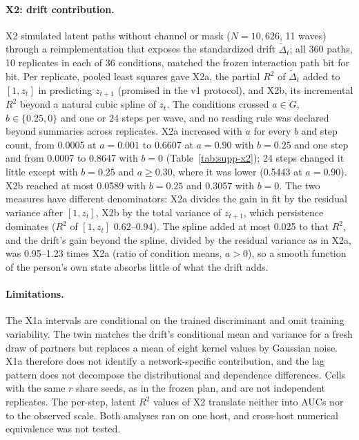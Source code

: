\paragraph{X2: drift contribution.}
X2 simulated latent paths without channel or mask ($N=10{,}626$, 11 waves) through a reimplementation that exposes the standardized drift $\tilde\Delta_t$; all 360 paths, 10 replicates in each of 36 conditions, matched the frozen interaction path bit for bit. %
Per replicate, pooled least squares gave X2a, the partial $R^2$ of $\tilde\Delta_t$ added to $[1,z_t]$ in predicting $z_{t+1}$ (promised in the v1 protocol), and X2b, its incremental $R^2$ beyond a natural cubic spline of $z_t$. %
The conditions crossed $a\in G$, $b\in\{0.25,0\}$ and one or 24 steps per wave, and no reading rule was declared beyond summaries across replicates. %
X2a increased with $a$ for every $b$ and step count, from 0.0005 at $a=0.001$ to 0.6607 at $a=0.90$ with $b=0.25$ and one step and from 0.0007 to 0.8647 with $b=0$ (Table~\ref{tab:supp-x2}); 24 steps changed it little except with $b=0.25$ and $a\geq0.30$, where it was lower (0.5443 at $a=0.90$). %
X2b reached at most 0.0589 with $b=0.25$ and 0.3057 with $b=0$. %
The two measures have different denominators: X2a divides the gain in fit by the residual variance after $[1,z_t]$, X2b by the total variance of $z_{t+1}$, which persistence dominates ($R^2$ of $[1,z_t]$ 0.62--0.94). %
The spline added at most 0.025 to that $R^2$, and the drift's gain beyond the spline, divided by the residual variance as in X2a, was 0.95--1.23 times X2a (ratio of condition means, $a>0$), so a smooth function of the person's own state absorbs little of what the drift adds. %

\paragraph{Limitations.}
The X1a intervals are conditional on the trained discriminant and omit training variability. %
The twin matches the drift's conditional mean and variance for a fresh draw of partners but replaces a mean of eight kernel values by Gaussian noise. %
X1a therefore does not identify a network-specific contribution, and the lag pattern does not decompose the distributional and dependence differences. %
Cells with the same $r$ share seeds, as in the frozen plan, and are not independent replicates. %
The per-step, latent $R^2$ values of X2 translate neither into AUCs nor to the observed scale. %
Both analyses ran on one host, and cross-host numerical equivalence was not tested. %

